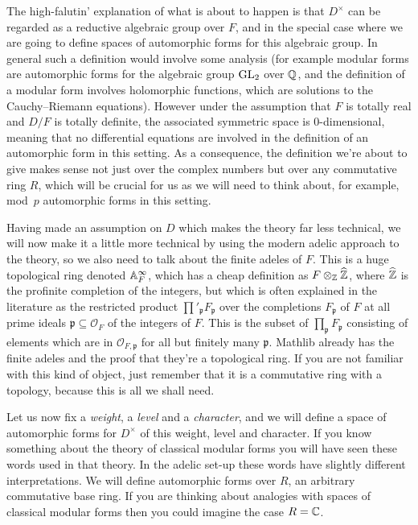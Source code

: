 The high-falutin' explanation of what is about to happen is that $D^\times$
can be regarded as a reductive algebraic group over $F$, and in the special case where
we are going to define spaces
of automorphic forms for this algebraic group. In general such a definition would
involve some analysis (for example modular forms are automorphic forms for the
algebraic group $\operatorname{GL}_2$ over $\mathbb{Q}$, and the definition of a modular form involves
holomorphic functions, which are solutions to the Cauchy--Riemann equations).
However under the assumption that $F$ is totally real and $D/F$ is totally definite,
the associated symmetric space is 0-dimensional, meaning that no differential equations are
involved in the definition
of an automorphic form in this setting. As a consequence, the definition we're about to give
makes sense not just over the complex numbers but over any commutative ring $R$, which will
be crucial for us as we will need to think about, for example, mod~$p$ automorphic forms in this
setting.

Having made an assumption on $D$ which makes the theory far less technical, we will now
make it a little more technical by using the modern adelic approach to the theory,
so we also need to talk about the finite adeles of $F$. This is a huge topological ring
denoted $\mathbb{A}_F^\infty$, which has a cheap definition as $F\otimes_{\mathbb{Z}}\widehat{\mathbb{Z}}$, where $\widehat{\mathbb{Z}}$ is
the profinite completion of the integers, but which is often explained in the literature
as the restricted product $\prod'_{\mathfrak{p}}F_{\mathfrak{p}}$ over the completions
$F_{\mathfrak{p}}$ of $F$ at all prime ideals $\mathfrak{p}\subseteq\mathcal{O}_F$ of the
integers of $F$. This is the subset of $\prod_{\mathfrak{p}}F_{\mathfrak{p}}$ consisting
of elements which are in $\mathcal{O}_{F,\mathfrak{p}}$ for all but finitely many $\mathfrak{p}$.
Mathlib already has the finite adeles and the proof that they're a topological ring. If you are
not familiar with this kind of object, just remember that it is a commutative ring with a topology,
because this is all we shall need.

Let us now fix a \emph{weight}, a \emph{level} and a \emph{character}, and we will define
a space of automorphic forms for $D^\times$ of this weight, level and character. If you know something
about the theory of classical modular forms you will have seen these words used in that theory.
In the adelic set-up these words have slightly different interpretations. We will define automorphic
forms over $R$, an arbitrary commutative base ring. If you are thinking about analogies with
spaces of classical modular forms then you could imagine the case $R=\mathbb{C}$.

